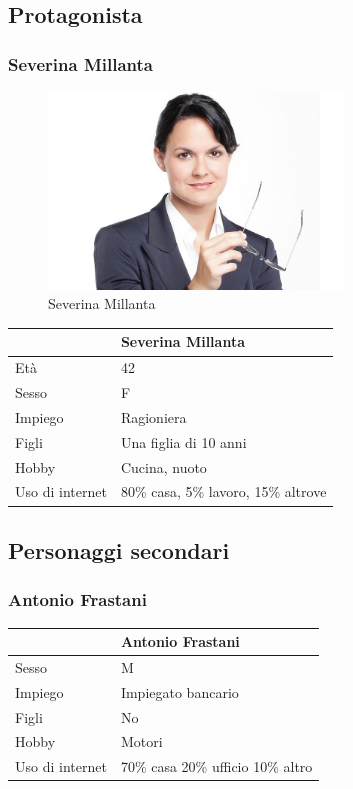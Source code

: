 \documentclass[12pt,italian,]{report}
\begin{document}
\hypertarget{protagonista}{%
\subsection{Protagonista}\label{protagonista}}

\hypertarget{severina-millanta}{%
\subsubsection{Severina Millanta}\label{severina-millanta}}

\begin{figure}[h]
\centering
\includegraphics[width=0.7\textwidth,height=\textheight]{img/severina.jpg}
\caption{Severina Millanta}
\end{figure}

\begin{longtable}[h]{@{}ll@{}}
\toprule
& Severina Millanta\tabularnewline
\midrule
\endhead
Età & 42\tabularnewline
Sesso & F\tabularnewline
Impiego & Ragioniera\tabularnewline
Figli & Una figlia di 10 anni\tabularnewline
Hobby & Cucina, nuoto\tabularnewline
Uso di internet & 80\% casa, 5\% lavoro, 15\% altrove\tabularnewline
\bottomrule
\end{longtable}

\hypertarget{personaggi-secondari}{%
\subsection{Personaggi secondari}\label{personaggi-secondari}}

\hypertarget{antonio-frastani}{%
\subsubsection{Antonio Frastani}\label{antonio-frastani}}

\begin{longtable}[]{@{}ll@{}}
\toprule
& Antonio Frastani\tabularnewline
\midrule
\endhead
Sesso & M\tabularnewline
Impiego & Impiegato bancario\tabularnewline
Figli & No\tabularnewline
Hobby & Motori\tabularnewline
Uso di internet & 70\% casa 20\% ufficio 10\% altro\tabularnewline
\bottomrule
\end{longtable}
\end{document}
